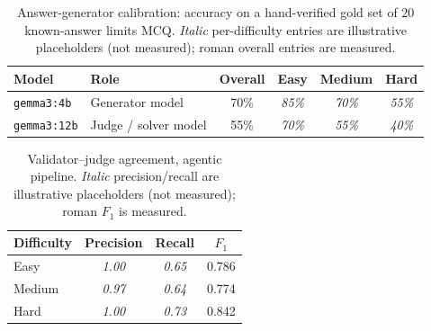 \begin{table}[t]
\centering
\small
\caption{Answer-generator calibration: accuracy on a hand-verified gold set of
$20$ known-answer limits MCQ. \emph{Italic} per-difficulty entries are illustrative
placeholders (not measured); roman overall entries are measured.}
\label{tab:bulk-gold}
\begin{tabular}{llcccc}
\toprule
Model & Role & Overall & Easy & Medium & Hard \\
\midrule
\texttt{gemma3:4b}  & Generator model      & 70\% & \textit{85\%} & \textit{70\%} & \textit{55\%} \\
\texttt{gemma3:12b} & Judge / solver model & 55\% & \textit{70\%} & \textit{55\%} & \textit{40\%} \\
\bottomrule
\end{tabular}
\end{table}

\begin{table}[t]
\centering
\small
\caption{Validator--judge agreement, agentic pipeline. \emph{Italic}
precision/recall are illustrative placeholders (not measured); roman $F_1$ is
measured.}
\label{tab:bulk-f1}
\begin{tabular}{lccc}
\toprule
Difficulty & Precision & Recall & $F_1$ \\
\midrule
Easy   & \textit{1.00} & \textit{0.65} & 0.786 \\
Medium & \textit{0.97} & \textit{0.64} & 0.774 \\
Hard   & \textit{1.00} & \textit{0.73} & 0.842 \\
\bottomrule
\end{tabular}
\end{table}

